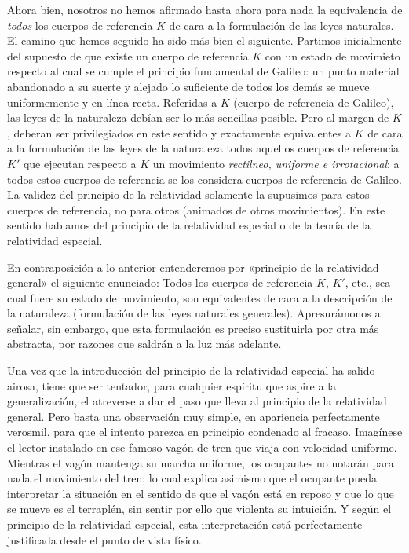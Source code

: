 \documentclass[spanish]{book}
\begin{document}
Ahora bien, nosotros no hemos afirmado hasta ahora para nada la equivalencia de \textit{todos}
los cuerpos de referencia $K$ de cara a la formulación de las leyes naturales. El camino
que hemos seguido ha sido más bien el siguiente. Partimos inicialmente del supuesto
de que existe un cuerpo de referencia $K$ con un estado de movimieto respecto al
cual se cumple el principio fundamental de Galileo: un punto material abandonado a
su suerte y alejado lo suficiente de todos los demás se mueve uniformemente y en línea
recta. Referidas a $K$ (cuerpo de referencia de Galileo), las leyes de la naturaleza debían
ser lo más sencillas posible. Pero al margen de $K$, deberan ser privilegiados en este
sentido y exactamente equivalentes a $K$ de cara a la formulación de las leyes de la
naturaleza todos aquellos cuerpos de referencia $K'$ que ejecutan respecto a $K$ un
movimiento \textit{rectilneo, uniforme e irrotacional}: a todos estos cuerpos de referencia se los
considera cuerpos de referencia de Galileo. La validez del principio de la relatividad
solamente la supusimos para estos cuerpos de referencia, no para otros (animados de
otros movimientos). En este sentido hablamos del principio de la relatividad especial o
de la teoría de la relatividad especial.

En contraposición a lo anterior entenderemos por «principio de la relatividad
general» el siguiente enunciado: Todos los cuerpos de referencia $K$, $K'$, etc., sea cual
fuere su estado de movimiento, son equivalentes de cara a la descripción de la
naturaleza (formulación de las leyes naturales generales). Apresurámonos a señalar, sin
embargo, que esta formulación es preciso sustituirla por otra más abstracta, por razones
que saldrán a la luz más adelante.

Una vez que la introducción del principio de la relatividad especial ha salido airosa,
tiene que ser tentador, para cualquier espíritu que aspire a la generalización, el atreverse
a dar el paso que lleva al principio de la relatividad general. Pero basta una observación
muy simple, en apariencia perfectamente verosmil, para que el intento parezca en
principio condenado al fracaso. Imagínese el lector instalado en ese famoso vagón de
tren que viaja con velocidad uniforme. Mientras el vagón mantenga su marcha
uniforme, los ocupantes no notarán para nada el movimiento del tren; lo cual explica
asimismo que el ocupante pueda interpretar la situación en el sentido de que el vagón
está en reposo y que lo que se mueve es el terraplén, sin sentir por ello que violenta
su intuición. Y según el principio de la relatividad especial, esta interpretación está
perfectamente justificada desde el punto de vista físico.
\end{document}
